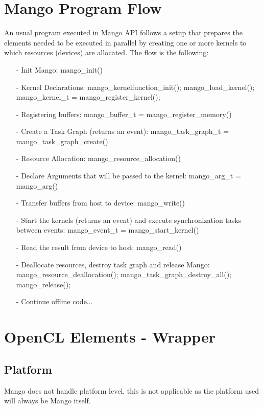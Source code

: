 \documentclass[a4paper]{article}
\begin{document}
\section{Mango Program Flow}
An usual program executed in Mango API follows a setup that prepares the elements needed to be executed in parallel by creating one or more kernels to which resources (devices) are allocated.
The flow is the following:
\begin{itemize}
	\item[-] Init Mango: \ttfamily mango\_init() \rmfamily
        	\item[-] Kernel Declarations: \ttfamily mango\_kernelfunction\_init(); mango\_load\_kernel(); mango\_kernel\_t = mango\_register\_kernel();  \rmfamily
	\item[-] Registering buffers: \ttfamily mango\_buffer\_t = mango\_register\_memory() \rmfamily
	\item[-] Create a Task Graph (returns an event):  \ttfamily mango\_task\_graph\_t = mango\_task\_graph\_create() \rmfamily
	\item[-] Resource Allocation: \ttfamily mango\_resource\_allocation() \rmfamily
	\item[-] Declare Arguments that will be passed to the kernel: \ttfamily mango\_arg\_t = mango\_arg() \rmfamily
	\item[-] Transfer buffers from host to device: \ttfamily mango\_write() \rmfamily
	\item[-] Start the kernels (returns an event) and execute synchronization tasks between events: \ttfamily mango\_event\_t = mango\_start\_kernel() \rmfamily
	\item[-] Read the result from device to host: \ttfamily mango\_read() \rmfamily
	\item[-] Deallocate resources, destroy task graph and release Mango: \ttfamily mango\_resource\_deallocation(); mango\_task\_graph\_destroy\_all(); mango\_release(); \rmfamily
	\item[-] Continue offline code... 
\end{itemize} 

\section{OpenCL Elements - Wrapper}
\subsection{Platform}
Mango does not handle platform level, this is not applicable as the platform used will always be Mango itself.
\end{document}
